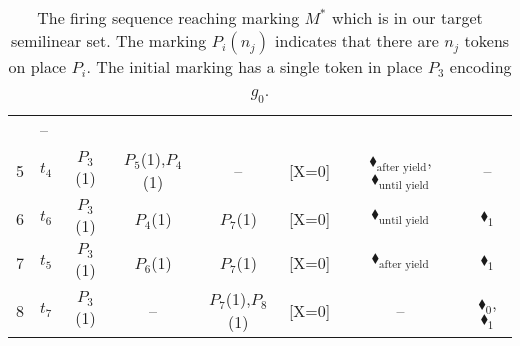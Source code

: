 \begin{table}[!htbp]
{\begin{tabular}{c l c c c c c c}
			& --                                    \\
			5 & $t_4$                                  
			& {\color{blue}$P_3$(1)}                  
			& $P_5$(1),$P_4$(1)                          
			& --                                    
			&                                   {\color{blue}[X=0]}     
			&                                    {\color{black}$\blacklozenge_\text{after yield}$}, {\color{black}$\blacklozenge_\text{until yield}$}   
			& --                                    \\
			6 & $t_6$                     
			& {\color{blue}$P_3$(1)}                  
			& $P_4$(1)                                
			& {\color{red}$P_7$(1)}                    
			&                                      	{\color{blue}[X=0]}  
			&                                    {\color{black}$\blacklozenge_\text{until yield}$}   
			&                                   {\color{red}$\blacklozenge_1$}     \\
			7 & $t_5$                                  
			& {\color{blue}$P_3$(1)}                  
			& $P_6$(1)                                
			& {\color{red}$P_7$(1)}                    
			&                                   {\color{blue}[X=0]}    
			&                                    {\color{black}$\blacklozenge_\text{after yield}$}      
			&                                   {\color{red}$\blacklozenge_1$}        \\
			8 & $t_7$                     
			& {\color{blue}$P_3$(1)}                                  
			& --                                    
			& {\color{red}$P_7$(1),\color{red}$P_8$(1)}    
			&                                   {\color{blue}[X=0]}    
			&                                   --    
			&                                   {\color{red}$\blacklozenge_0$}, {\color{red}$\blacklozenge_1$}       \\
			\bottomrule
		\end{tabular}
	}
	\caption{The firing sequence reaching marking $M^*$ which is in our target semilinear set. The marking $P_i(n_j)$ indicates that there are $n_j$ tokens on place $P_i$. The initial marking has a single token in place $P_3$ encoding $g_0$.}
	\label{tab:PetriNetFiringCounterexample}
\end{table}

